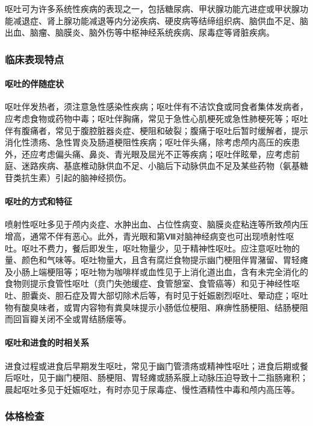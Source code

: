 呕吐可为许多系统性疾病的表现之一，包括糖尿病、甲状腺功能亢进症或甲状腺功能减退症、肾上腺功能减退等内分泌疾病、硬皮病等结缔组织病、脑供血不足、脑出血、脑瘤、脑膜炎、脑外伤等中枢神经系统疾病、尿毒症等肾脏疾病。

\subsubsection{临床表现特点}

\paragraph{呕吐的伴随症状}

呕吐伴发热者，须注意急性感染性疾病；呕吐伴有不洁饮食或同食者集体发病者，应考虑食物或药物中毒；呕吐伴胸痛，常见于急性心肌梗死或急性肺梗死等；呕吐伴有腹痛者，常见于腹腔脏器炎症、梗阻和破裂；腹痛于呕吐后暂时缓解者，提示消化性溃疡、急性胃炎及肠道梗阻性疾病；呕吐伴头痛，除考虑颅内高压的疾患外，还应考虑偏头痛、鼻炎、青光眼及屈光不正等疾病；呕吐伴眩晕，应考虑前庭、迷路疾病、基底椎动脉供血不足、小脑后下动脉供血不足及某些药物（氨基糖苷类抗生素）引起的脑神经损伤。

\paragraph{呕吐的方式和特征}

喷射性呕吐多见于颅内炎症、水肿出血、占位性病变、脑膜炎症粘连等所致颅内压增高，通常不伴有恶心。此外，青光眼和第Ⅷ对脑神经病变也可出现喷射性呕吐。呕吐不费力，餐后即发生，呕吐物量少，见于精神性呕吐。应注意呕吐物的量、颜色和气味等。呕吐物量大，且含有腐烂食物提示幽门梗阻伴胃潴留、胃轻瘫及小肠上端梗阻等；呕吐物为咖啡样或血性见于上消化道出血，含有未完全消化的食物则提示食管性呕吐（贲门失弛缓症、食管憩室、食管癌等）和见于神经性呕吐、胆囊炎、胆石症及胃大部切除术后等，有时见于妊娠剧烈呕吐、晕动症；呕吐物有酸臭味者，或胃内容物有粪臭味提示小肠低位梗阻、麻痹性肠梗阻、结肠梗阻而回盲瓣关闭不全或胃结肠瘘等。

\paragraph{呕吐和进食的时相关系}

进食过程或进食后早期发生呕吐，常见于幽门管溃疡或精神性呕吐；进食后期或餐后呕吐，见于幽门梗阻、肠梗阻、胃轻瘫或肠系膜上动脉压迫导致十二指肠雍积；晨起呕吐多见于妊娠呕吐，有时亦见于尿毒症、慢性酒精性中毒和颅内高压等。

\subsubsection{体格检查}

